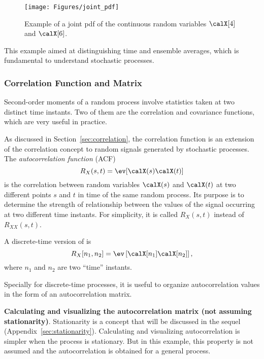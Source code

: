 \begin{figure}[htbp]
	\centering
		\texttt{[image: Figures/joint\_pdf]}		
	\caption{Example of a joint pdf of the continuous random variables $\calX[4]$ and $\calX[6]$.\label{fig:joint_pdf}}
\end{figure}

This example aimed at distinguishing time and ensemble averages, which
is fundamental to understand stochastic processes.
\eExample

\subsubsection{Correlation Function and Matrix}
\label{sec:appendix_correlation}

Second-order moments of a random process involve statistics taken at two distinct time instants.
Two of them are the correlation and covariance functions, which are very useful in practice.

As discussed in Section~\ref{sec:correlation}, the correlation function is an extension of the correlation concept to random signals generated by stochastic processes.
The \emph{autocorrelation function} (ACF) 
\begin{equation}
R_{X}(s,t) = \ev[\calX(s) \calX(t)]
	\label{eq:autocorrelationPrevious2}
\end{equation}
is the correlation between random variables $\calX(s)$ and $\calX(t)$ at two different points $s$ and $t$ in time of the same random process.
Its purpose is to determine the strength of relationship between the values of the signal occurring at two different time instants. For simplicity, it is called $R_{X}(s,t)$ instead of $R_{XX}(s,t)$.

A discrete-time version of  is
\begin{equation}
R_X[n_1,n_2] = \ev \left[ \calX[n_1] \calX[n_2] \right],
\label{eq:discreteTimeCorrelationPrevious}
\end{equation}
where $n_1$ and $n_2$ are two ``time'' instants.

Specially for discrete-time processes, it is useful to organize autocorrelation values
in the form of an autocorrelation matrix.

\bExample \textbf{Calculating and visualizing the autocorrelation matrix (not assuming stationarity)}.
Stationarity is a concept that will be discussed in the sequel (Appendix~\ref{sec:stationarity}).
Calculating and visualizing autocorrelation is simpler when the process is stationary. But in
this example, this property is not assumed and the autocorrelation is obtained for a general process.


